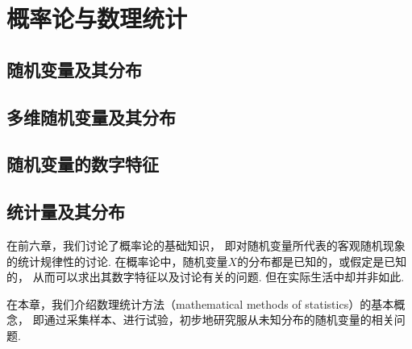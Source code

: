 \part{概率论与数理统计}
\begingroup
\def\x{\chi^2}%
\def\dotsim{\overset{.}{\sim}}%



\chapter{随机变量及其分布}





\chapter{多维随机变量及其分布}








\chapter{随机变量的数字特征}










\chapter{统计量及其分布}
在前六章，我们讨论了概率论的基础知识，
即对随机变量所代表的客观随机现象的统计规律性的讨论.
在概率论中，随机变量\(X\)的分布都是已知的，或假定是已知的，
从而可以求出其数字特征以及讨论有关的问题.
但在实际生活中却并非如此.

在本章，我们介绍数理统计方法（mathematical methods of statistics）的基本概念，
即通过采集样本、进行试验，初步地研究服从未知分布的随机变量的相关问题.

